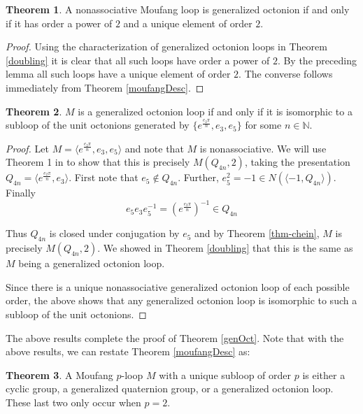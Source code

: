 \documentclass[12pt, twoside, openright]{report}
\theoremstyle{definition}
\newtheorem{thm}{Theorem}[chapter]
\newcommand{\NNN}{\mathbb{N}}
\begin{document}
\begin{thm}
	A nonassociative Moufang loop is generalized octonion if and only if it has order a power of $2$ and
    a unique element of order $2$.
\end{thm}

\begin{proof}
	Using the characterization of generalized octonion loops in Theorem \ref{doubling} it is clear that
    all such loops have order a power of $2$. By the preceding lemma all such loops have a unique element
    of order $2$. The converse follows immediately from Theorem \ref{moufangDesc}.
\end{proof}

\begin{thm}
	$M$ is a generalized octonion loop if and only if it is isomorphic to a subloop of the unit octonions
    generated by $\{e^{\frac{e_2\pi}{n}}, e_3, e_5\}$ for some $n\in\NNN$.
\end{thm}

\begin{proof}
  Let $M = \langle e^{\frac{e_2\pi}{n}}, e_3, e_5\rangle$ and note that $M$ is nonassociative. We will use
    Theorem 1 in \cite{Chein} to show that this is precisely $M(Q_{4n}, 2)$, taking the presentation
    $Q_{4n}  = \langle e^{\frac{e_2\pi}{n}}, e_3\rangle$. First note that $e_5\notin Q_{4n}$. Further,
    $e_5^2 = -1\in N(\langle -1, Q_{4n}\rangle)$. Finally
	\[e_5 e_3 e_5^{-1} = (e^{\frac{e_2\pi}{n}})^{-1}\in Q_{4n}\]

  Thus $Q_{4n}$ is closed under conjugation by $e_5$ and by Theorem \ref{thm-chein}, $M$ is precisely
    $M(Q_{4n}, 2)$. We showed in Theorem \ref{doubling} that this is the same as $M$ being a generalized
    octonion loop.

	Since there is a unique nonassociative generalized octonion loop of each possible order, the above
    shows that any generalized octonion loop is isomorphic to such a subloop of the unit octonions.
\end{proof}

The above results complete the proof of Theorem \ref{genOct}. Note that with the above results, we can
  restate Theorem \ref{moufangDesc} as:

\begin{thm}
	A Moufang $p$-loop $M$ with a unique subloop of order $p$ is either a cyclic group, a generalized
    quaternion group, or a generalized octonion loop. These last two only occur when $p = 2$.
\end{thm}
\end{document}
